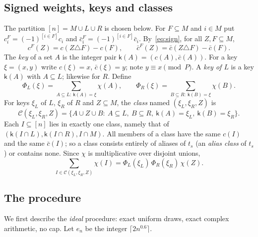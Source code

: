 \documentclass[11pt]{article}
\theoremstyle{definition}
\newcommand{\bc}{\bar c}
\newcommand{\ceil}[1]{\lceil #1\rceil}
\newcommand{\cC}{\mathcal C}
\newcommand{\key}{\mathsf k}
\begin{document}
\subsection{Signed weights, keys and classes}
The partition $[n]=M\cup L\cup R$ is chosen below. For $F\subseteq M$ and $i\in M$ put
$c^F_i=(-1)^{[i\in F]}c_i$ and $\bc^F_i=(-1)^{[i\in F]}\bc_i$. By~\eqref{eq:sign}, for all $Z,F\subseteq M$,
\begin{equation}\label{eq:signcF}
 c^F(Z)=c(Z\triangle F)-c(F),\qquad \bc^F(Z)=\bc(Z\triangle F)-\bc(F).
\end{equation}
The \emph{key} of a set $A$ is the integer pair $\key(A)=(c(A),\bc(A))$. For a key $\xi=(x,y)$ write
$c(\xi)=x$, $\bc(\xi)=y$; note $y\equiv x\pmod P$. A \emph{key of $L$} is a key $\key(A)$ with $A\subseteq L$; likewise
for $R$. Define
\[
 \Phi_L(\xi)=\sum_{A\subseteq L:\ \key(A)=\xi}\chi(A),\qquad \Phi_R(\xi)=\sum_{B\subseteq R:\ \key(B)=\xi}\chi(B).
\]
For keys $\xi_L$ of $L$, $\xi_R$ of $R$ and $Z\subseteq M$, the \emph{class} named $(\xi_L,\xi_R,Z)$ is
\[
 \cC(\xi_L,\xi_R,Z)=\{A\cup Z\cup B:\ A\subseteq L,\ B\subseteq R,\ \key(A)=\xi_L,\ \key(B)=\xi_R\}.
\]
Each $I\subseteq[n]$ lies in exactly one class, namely that of $(\key(I\cap L),\key(I\cap R),I\cap M)$. All members
of a class have the same $c(I)$ and the same $\bc(I)$; so a class consists entirely of aliases of $t_s$ (an
\emph{alias class} of $t_s$) or contains none. Since $\chi$ is multiplicative over disjoint unions,
\begin{equation}\label{eq:classsum}
 \sum_{I\in\cC(\xi_L,\xi_R,Z)}\chi(I)=\Phi_L(\xi_L)\,\Phi_R(\xi_R)\,\chi(Z).
\end{equation}

\subsection{The procedure}\label{sec:procA}
We first describe the \emph{ideal} procedure: exact uniform draws, exact complex arithmetic, no cap.
Let $e_n$ be the integer $\ceil{2n^{0.6}}$.
\end{document}
